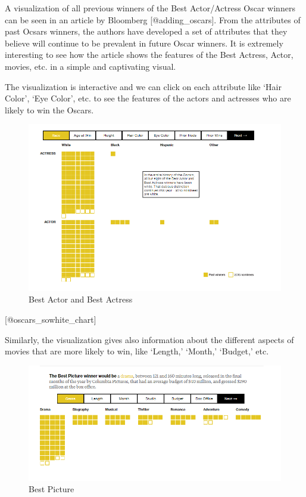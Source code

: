 \documentclass[]{book}
\theoremstyle{definition}
\theoremstyle{definition}
\theoremstyle{definition}
\theoremstyle{remark}
\begin{document}
A visualization of all previous winners of the Best Actor/Actress Oscar
winners can be seen in an article by Bloomberg {[}@adding\_oscars{]}.
From the attributes of past Ocsars winners, the authors have developed a
set of attributes that they believe will continue to be prevalent in
future Oscar winners. It is extremely interesting to see how the article
shows the features of the Best Actress, Actor, movies, etc. in a simple
and captivating visual.

The visualization is interactive and we can click on each attribute like
`Hair Color', `Eye Color', etc. to see the features of the actors and
actresses who are likely to win the Oscars.

\begin{figure}
\centering
\includegraphics{images/img_oscars_actors.PNG}
\caption{Best Actor and Best Actress}
\end{figure}

{[}@oscars\_sowhite\_chart{]}

Similarly, the visualization gives also information about the different
aspects of movies that are more likely to win, like `Length,' `Month,'
`Budget,' etc.

\begin{figure}
\centering
\includegraphics{images/img_oscars_pic.PNG}
\caption{Best Picture}
\end{figure}
\end{document}
